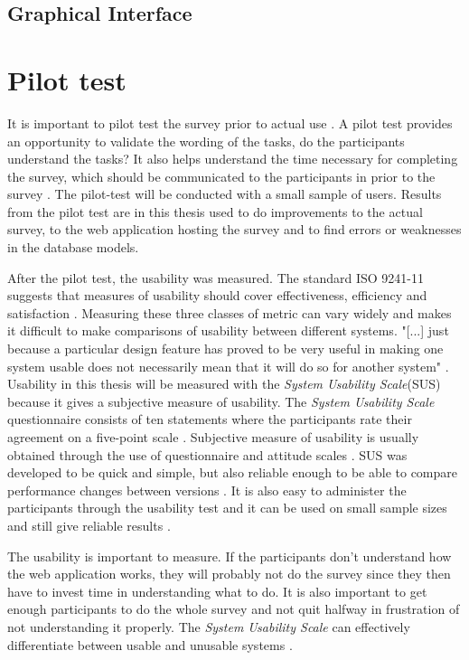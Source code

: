 \subsection{Graphical Interface}

\section{Pilot test}
It is important to pilot test the survey prior to actual use \citep{Ben2009}. A pilot test provides an opportunity to validate the wording of the tasks, do the participants understand the tasks? It also helps understand the time necessary for completing the survey, which should be communicated to the participants in prior to the survey \citep{Schade2015}. The pilot-test will be conducted with a small sample of users. Results from the pilot test are in this thesis used to do improvements to the actual survey, to the web application hosting the survey and to find errors or weaknesses in the database models.

After the pilot test, the usability was measured. The standard ISO 9241-11 suggests that measures of usability should cover effectiveness, efficiency and satisfaction \citep{ISO1998}. Measuring these three classes of metric can vary widely and makes it difficult to make comparisons of usability between different systems. "[...] just because a particular design feature has proved to be very useful in making one system usable does not necessarily mean that it will do so for another system" \citep{Brooke1996}. Usability in this thesis will be measured with the \textit{System Usability Scale}(SUS) because it gives a subjective measure of usability. The \textit{System Usability Scale} questionnaire consists of ten statements where the participants rate their agreement on a five-point scale \citep{Ben2009}. Subjective measure of usability is usually obtained through the use of questionnaire and attitude scales \citep{Brooke1996}. SUS was developed to be quick and simple, but also reliable enough to be able to compare performance changes between versions \citep{Brooke1996}. It is also easy to administer the participants through the usability test and it can be used on small sample sizes and still give reliable results \citep{Affairs2013}.  

The usability is important to measure. If the participants don't understand how the web application works, they will probably not do the survey since they then have to invest time in understanding what to do. %
It is also important to get enough participants to do the whole survey and not quit halfway in frustration of not understanding it properly. The \textit{System Usability Scale} can effectively differentiate between usable and unusable systems \citep{Affairs2013}. 

